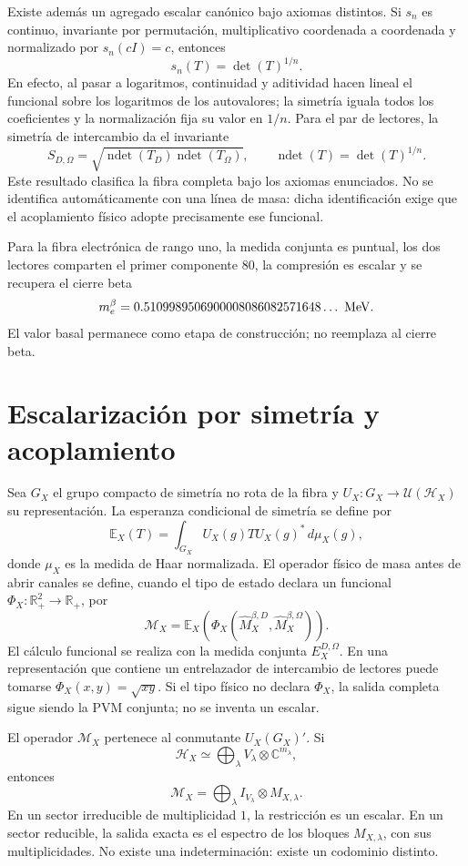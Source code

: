 Existe además un agregado escalar canónico bajo axiomas distintos. Si
\(s_n\) es continuo, invariante por permutación, multiplicativo coordenada a
coordenada y normalizado por \(s_n(cI)=c\), entonces
\[
 s_n(T)=\det(T)^{1/n}.
\]
En efecto, al pasar a logaritmos, continuidad y aditividad hacen lineal el
funcional sobre los logaritmos de los autovalores; la simetría iguala todos
los coeficientes y la normalización fija su valor en \(1/n\). Para el par de
lectores, la simetría de intercambio da el invariante
\[
 S_{D,\Omega}
 =\sqrt{
 \operatorname{ndet}(T_D)\operatorname{ndet}(T_\Omega)},
 \qquad
 \operatorname{ndet}(T)=\det(T)^{1/n}.
\]
Este resultado clasifica la fibra completa bajo los axiomas enunciados. No se
identifica automáticamente con una línea de masa: dicha identificación exige
que el acoplamiento físico adopte precisamente ese funcional.

Para la fibra electrónica de rango uno, la medida conjunta es puntual, los dos
lectores comparten el primer componente \(80\), la compresión es escalar y se
recupera el cierre beta
\[
 m_e^\beta
 =0.5109989506900008086082571648\ldots\ {\rm MeV}.
\]
El valor basal permanece como etapa de construcción; no reemplaza al cierre
beta.

\section{Escalarización por simetría y acoplamiento}

Sea \(G_X\) el grupo compacto de simetría no rota de la fibra y
\(U_X:G_X\to\mathcal U(\mathcal H_X)\) su representación. La esperanza
condicional de simetría se define por
\[
 \mathbb E_X(T)
 =\int_{G_X}U_X(g)TU_X(g)^*\,d\mu_X(g),
\]
donde \(\mu_X\) es la medida de Haar normalizada. El operador físico de masa
antes de abrir canales se define, cuando el tipo de estado declara un
funcional \(\Phi_X:\mathbb R_+^2\to\mathbb R_+\), por
\[
 \mathcal M_X
 =\mathbb E_X\!\left(
   \Phi_X(\widehat M_X^{\beta,D},\widehat M_X^{\beta,\Omega})
  \right).
\]
El cálculo funcional se realiza con la medida conjunta
\(E_X^{D,\Omega}\). En una representación que contiene un entrelazador de
intercambio de lectores puede tomarse \(\Phi_X(x,y)=\sqrt{xy}\). Si el tipo
físico no declara \(\Phi_X\), la salida completa sigue siendo la PVM conjunta;
no se inventa un escalar.

\begin{theorem}
El operador \(\mathcal M_X\) pertenece al conmutante
\(U_X(G_X)'\). Si
\[
 \mathcal H_X\simeq
 \bigoplus_\lambda V_\lambda\otimes\mathbb C^{m_\lambda},
\]
entonces
\[
 \mathcal M_X=
 \bigoplus_\lambda I_{V_\lambda}\otimes M_{X,\lambda}.
\]
En un sector irreducible de multiplicidad \(1\), la restricción es un escalar.
En un sector reducible, la salida exacta es el espectro de los bloques
\(M_{X,\lambda}\), con sus multiplicidades. No existe una indeterminación:
existe un codominio distinto.
\end{theorem}

